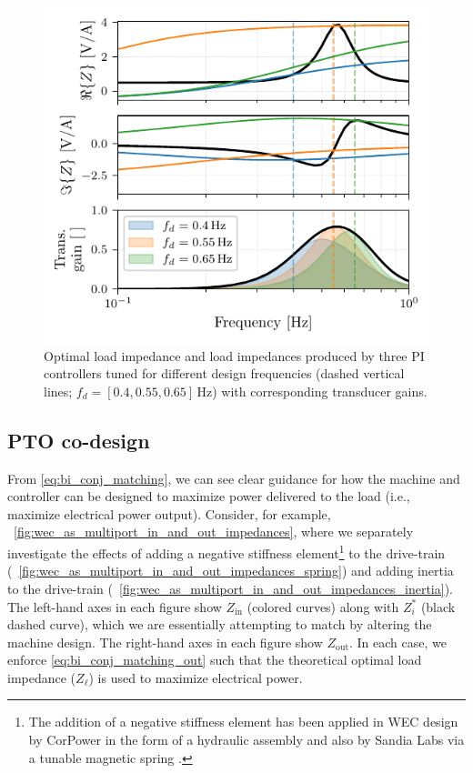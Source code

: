 \documentclass[lettersize,journal]{IEEEtran}
\begin{document}
\begin{figure}[tb]
        \centering
        \includegraphics[width=1\columnwidth]{wec_as_multiport_pi_controllers_real_imag.pdf}
        \caption{Optimal load impedance and load impedances produced by three PI controllers tuned for different design frequencies (dashed vertical lines; $f_d = [0.4, 0.55, 0.65]$\,Hz) with corresponding transducer gains.}
        \label{fig:gfx/wec_as_multiport_pi_controllers_real_imag}
\end{figure}

\subsection{PTO co-design}\label{sec:pto_codesign}
From \eqref{eq:bi_conj_matching}, we can see clear guidance for how the machine and controller can be designed to maximize power delivered to the load (i.e., maximize electrical power output).
Consider, for example, \figurename~\ref{fig:wec_as_multiport_in_and_out_impedances}, where we separately investigate the effects of adding a negative stiffness element\footnote{The addition of a negative stiffness element has been applied in WEC design by CorPower in the form of a hydraulic assembly \cite{Todalshaug:2016aa} and also by Sandia Labs via a tunable magnetic spring \cite{Forbush:2024aa}.} to the drive-train (\figurename~\ref{fig:wec_as_multiport_in_and_out_impedances_spring}) and adding inertia to the drive-train (\figurename~\ref{fig:wec_as_multiport_in_and_out_impedances_inertia}).
The left-hand axes in each figure show $Z_{\textrm{in}}$ (colored curves) along with $Z_i^*$ (black dashed curve), which we are essentially attempting to match by altering the machine design.
The right-hand axes in each figure show $Z_{\textrm{out}}$.
In each case, we enforce \eqref{eq:bi_conj_matching_out} such that the theoretical optimal load impedance ($Z_\ell$) is used to maximize electrical power.
\end{document}
